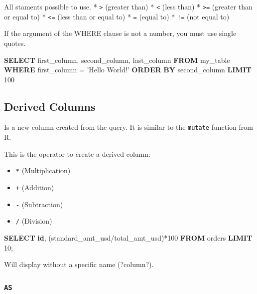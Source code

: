 \documentclass[]{book}
\newenvironment{Shaded}{\begin{snugshade}}{\end{snugshade}}
\newcommand{\KeywordTok}[1]{\textcolor[rgb]{0.13,0.29,0.53}{\textbf{#1}}}
\newcommand{\DecValTok}[1]{\textcolor[rgb]{0.00,0.00,0.81}{#1}}
\newcommand{\StringTok}[1]{\textcolor[rgb]{0.31,0.60,0.02}{#1}}
\newcommand{\NormalTok}[1]{#1}
\providecommand{\tightlist}{%
  \setlength{\itemsep}{0pt}\setlength{\parskip}{0pt}}
\begin{document}
All staments possible to use. * \texttt{\textgreater{}} (greater than) *
\texttt{\textless{}} (less than) * \texttt{\textgreater{}=} (greater
than or equal to) * \texttt{\textless{}=} (less than or equal to) *
\texttt{=} (equal to) * \texttt{!=} (not equal to)

If the argument of the WHERE clause is not a number, you must use single
quotes.

\begin{Shaded}
\begin{Highlighting}[]
\KeywordTok{SELECT}\NormalTok{ first_column, second_column, last_column}
  \KeywordTok{FROM}\NormalTok{ my_table}
\KeywordTok{WHERE}\NormalTok{ first_column = }\StringTok{'Hello World!'}
\KeywordTok{ORDER} \KeywordTok{BY}\NormalTok{ second_column}
\KeywordTok{LIMIT} \DecValTok{100}
\end{Highlighting}
\end{Shaded}

\subsection{Derived Columns}\label{derived-columns}

Is a new column created from the query. It is similar to the
\texttt{mutate} function from R.

This is the operator to create a derived column:

\begin{itemize}
\tightlist
\item
  \texttt{*} (Multiplication)
\item
  \texttt{+} (Addition)
\item
  \texttt{-} (Subtraction)
\item
  \texttt{/} (Division)
\end{itemize}

\begin{Shaded}
\begin{Highlighting}[]
\KeywordTok{SELECT} \KeywordTok{id}\NormalTok{, (standard_amt_usd/total_amt_usd)*}\DecValTok{100}
\KeywordTok{FROM}\NormalTok{ orders}
\KeywordTok{LIMIT} \DecValTok{10}\NormalTok{;}
\end{Highlighting}
\end{Shaded}

Will display without a specific name (?column?).

\subsubsection{\texorpdfstring{\texttt{AS}}{AS}}\label{as}
\end{document}
